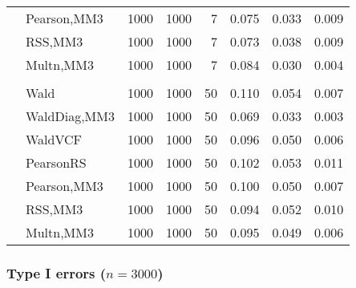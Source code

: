 \documentclass[
]{article}
\begin{document}
\begin{table}[H]
{\begin{tabular}[t]{llrrrrrr}
\hspace{1em} & Pearson,MM3 & 1000 & 1000 & 7 & 0.075 & 0.033 & 0.009\\

\hspace{1em} & RSS,MM3 & 1000 & 1000 & 7 & 0.073 & 0.038 & 0.009\\

\hspace{1em} & Multn,MM3 & 1000 & 1000 & 7 & 0.084 & 0.030 & 0.004\\
\cmidrule{1-8}
\addlinespace[0.3em]
\multicolumn{8}{l}{\textbf{3F 15V}}\\
\hspace{1em} & Wald & 1000 & 1000 & 50 & 0.110 & 0.054 & 0.007\\

\hspace{1em} & WaldDiag,MM3 & 1000 & 1000 & 50 & 0.069 & 0.033 & 0.003\\

\hspace{1em} & WaldVCF & 1000 & 1000 & 50 & 0.096 & 0.050 & 0.006\\

\hspace{1em} & PearsonRS & 1000 & 1000 & 50 & 0.102 & 0.053 & 0.011\\

\hspace{1em} & Pearson,MM3 & 1000 & 1000 & 50 & 0.100 & 0.050 & 0.007\\

\hspace{1em} & RSS,MM3 & 1000 & 1000 & 50 & 0.094 & 0.052 & 0.010\\

\hspace{1em} & Multn,MM3 & 1000 & 1000 & 50 & 0.095 & 0.049 & 0.006\\
\bottomrule
\end{tabular}}
\end{table}

\hypertarget{type-i-errors-n3000}{%
\subsubsection{\texorpdfstring{Type I errors
(\(n=3000\))}{Type I errors (n=3000)}}\label{type-i-errors-n3000}}
\end{document}
